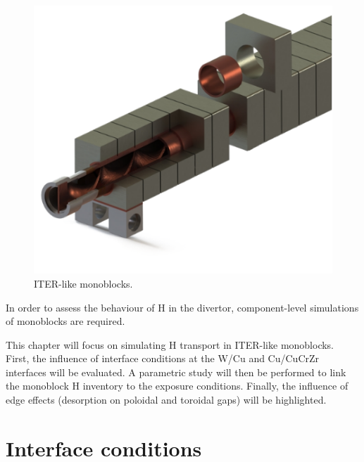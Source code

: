 \begin{figure}
    \centering
    \includegraphics[width=0.7\linewidth]{Figures/Chapter3/monoblocks_with_pipe.png}
    \caption{ITER-like monoblocks.}
    \label{fig: monoblocks with pipe}
\end{figure}

In order to assess the behaviour of H in the divertor, component-level simulations of monoblocks are required.

This chapter will focus on simulating H transport in ITER-like monoblocks.
First, the influence of interface conditions at the W/Cu and Cu/CuCrZr interfaces will be evaluated.
A parametric study will then be performed to link the monoblock H inventory to the exposure conditions.
Finally, the influence of edge effects (desorption on poloidal and toroidal gaps) will be highlighted.

\section{Interface conditions}




